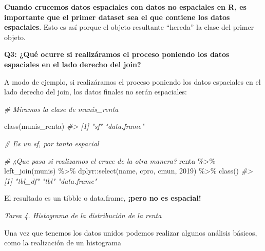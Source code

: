 \documentclass[
]{book}
\newenvironment{Shaded}{\begin{snugshade}}{\end{snugshade}}
\newcommand{\AttributeTok}[1]{\textcolor[rgb]{0.77,0.63,0.00}{#1}}
\newcommand{\CommentTok}[1]{\textcolor[rgb]{0.56,0.35,0.01}{\textit{#1}}}
\newcommand{\FunctionTok}[1]{\textcolor[rgb]{0.00,0.00,0.00}{#1}}
\newcommand{\NormalTok}[1]{#1}
\newcommand{\SpecialCharTok}[1]{\textcolor[rgb]{0.00,0.00,0.00}{#1}}
\newcommand{\StringTok}[1]{\textcolor[rgb]{0.31,0.60,0.02}{#1}}
\begin{document}
\textbf{Cuando crucemos datos espaciales con datos no espaciales en R, es importante
que el primer dataset sea el que contiene los datos espaciales}. Esto es así
porque el objeto resultante ``hereda'' la clase del primer objeto.

\textbf{Q3: ¿Qué ocurre si realizáramos el proceso poniendo los datos espaciales en el
lado derecho del join?}

A modo de ejemplo, si realizáramos el proceso poniendo los datos espaciales en
el lado derecho del join, los datos finales no serán espaciales:

\begin{Shaded}
\begin{Highlighting}[]

\CommentTok{\# Miramos la clase de munis\_renta}

\FunctionTok{class}\NormalTok{(munis\_renta)}
\CommentTok{\#\textgreater{} [1] "sf"         "data.frame"}

\CommentTok{\# Es un sf, por tanto espacial}

\CommentTok{\# ¿Que pasa si realizamos el cruce de la otra manera?}
\NormalTok{renta }\SpecialCharTok{\%\textgreater{}\%}
  \FunctionTok{left\_join}\NormalTok{(munis) }\SpecialCharTok{\%\textgreater{}\%}
\NormalTok{  dplyr}\SpecialCharTok{::}\FunctionTok{select}\NormalTok{(name, cpro, cmun, }\StringTok{\textasciigrave{}}\AttributeTok{2019}\StringTok{\textasciigrave{}}\NormalTok{) }\SpecialCharTok{\%\textgreater{}\%}
  \FunctionTok{class}\NormalTok{()}
\CommentTok{\#\textgreater{} [1] "tbl\_df"     "tbl"        "data.frame"}
\end{Highlighting}
\end{Shaded}

El resultado es un tibble o data.frame, \textbf{¡pero no es espacial!}

\emph{Tarea 4. Histograma de la distribución de la renta}

Una vez que tenemos los datos unidos podemos realizar algunos análisis básicos,
como la realización de un histograma
\end{document}
